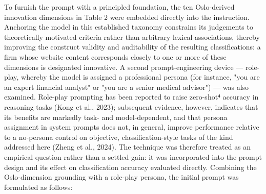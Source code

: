 \documentclass[runningheads]{llncs}
\begin{document}
To furnish the prompt with a principled foundation, the ten Oslo-derived innovation dimensions in Table 2 were embedded directly into the instruction. Anchoring the model in this established taxonomy constrains its judgements to theoretically motivated criteria rather than arbitrary lexical associations, thereby improving the construct validity and auditability of the resulting classifications: a firm whose website content corresponds closely to one or more of these dimensions is designated innovative. A second prompt-engineering device — role-play, whereby the model is assigned a professional persona (for instance, "you are an expert financial analyst" or "you are a senior medical advisor") — was also examined. Role-play prompting has been reported to raise zero-shot⁴ accuracy in reasoning tasks (Kong et al., 2023); subsequent evidence, however, indicates that its benefits are markedly task- and model-dependent, and that persona assignment in system prompts does not, in general, improve performance relative to a no-persona control on objective, classification-style tasks of the kind addressed here (Zheng et al., 2024). The technique was therefore treated as an empirical question rather than a settled gain: it was incorporated into the prompt design and its effect on classification accuracy evaluated directly. Combining the Oslo-dimension grounding with a role-play persona, the initial prompt was formulated as follows: 
\end{document}
